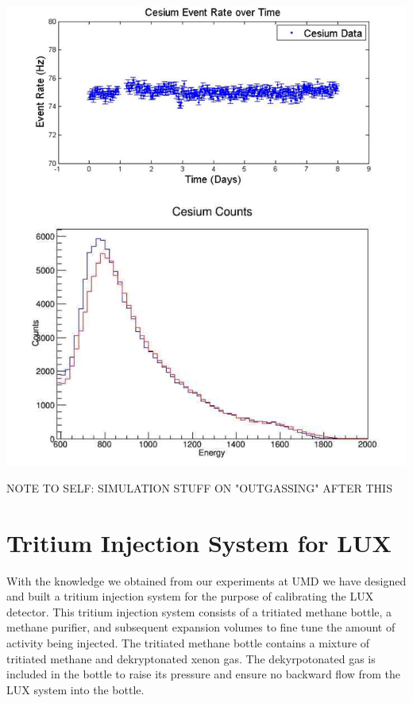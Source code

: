 \documentclass[a4paper,12pt]{article}
\begin{document}
\begin{center}
\includegraphics[scale=0.7]{Cesium_Combined.png}
\end{center}

NOTE TO SELF: SIMULATION STUFF ON "OUTGASSING" AFTER THIS


\section{Tritium Injection System for LUX}

With the knowledge we obtained from our experiments at UMD we have designed and built a tritium injection system for the purpose of calibrating the LUX detector.  This tritium injection system consists of a tritiated methane bottle, a methane purifier, and subsequent expansion volumes to fine tune the amount of activity being injected.  The tritiated methane bottle contains a mixture of tritiated methane and dekryptonated xenon gas.  The dekyrpotonated gas is included in the bottle to raise its pressure and ensure no backward flow from the LUX system into the bottle.
\end{document}
